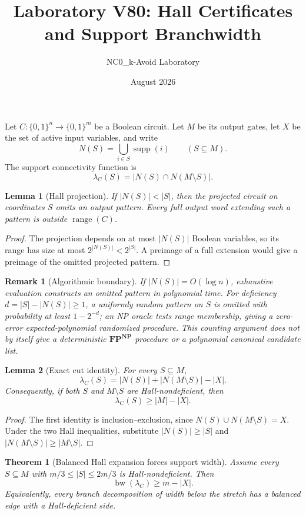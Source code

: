 \documentclass[11pt]{article}
\title{Laboratory V80: Hall Certificates and Support Branchwidth}
\author{NC0\_k-Avoid Laboratory}
\date{August 2026}
\newtheorem{theorem}{Theorem}
\newtheorem{lemma}{Lemma}
\newtheorem{remark}{Remark}
\begin{document}
\maketitle

Let $C:\{0,1\}^n\to\{0,1\}^m$ be a Boolean circuit. Let $M$ be its
output gates, let $X$ be the set of active input variables, and write
\[
 N(S)=\bigcup_{i\in S}\operatorname{supp}(i)
 \qquad(S\subseteq M).
\]
The support connectivity function is
\[
 \lambda_C(S)=|N(S)\cap N(M\setminus S)|.
\]

\begin{lemma}[Hall projection]
If $|N(S)|<|S|$, then the projected circuit on coordinates $S$ omits an
output pattern. Every full output word extending such a pattern is outside
$\operatorname{range}(C)$.
\end{lemma}

\begin{proof}
The projection depends on at most $|N(S)|$ Boolean variables, so its range has
size at most $2^{|N(S)|}<2^{|S|}$. A preimage of a full extension would give a
preimage of the omitted projected pattern.
\end{proof}

\begin{remark}[Algorithmic boundary]
If $|N(S)|=O(\log n)$, exhaustive evaluation constructs an omitted pattern in
polynomial time. For deficiency $d=|S|-|N(S)|\geq1$, a uniformly random pattern
on $S$ is omitted with probability at least $1-2^{-d}$; an NP oracle tests
range membership, giving a zero-error expected-polynomial randomized
procedure. This counting argument does not by itself give a deterministic
$\mathbf{FP}^{\mathbf{NP}}$ procedure or a polynomial canonical candidate
list.
\end{remark}

\begin{lemma}[Exact cut identity]
For every $S\subseteq M$,
\[
 \lambda_C(S)=|N(S)|+|N(M\setminus S)|-|X|.
\]
Consequently, if both $S$ and $M\setminus S$ are Hall-nondeficient, then
\[
 \lambda_C(S)\geq |M|-|X|.
\]
\end{lemma}

\begin{proof}
The first identity is inclusion--exclusion, since
$N(S)\cup N(M\setminus S)=X$. Under the two Hall inequalities, substitute
$|N(S)|\geq|S|$ and
$|N(M\setminus S)|\geq|M\setminus S|$.
\end{proof}

\begin{theorem}[Balanced Hall expansion forces support width]
Assume every $S\subseteq M$ with
$m/3\leq |S|\leq2m/3$ is Hall-nondeficient. Then
\[
 \operatorname{bw}(\lambda_C)\geq m-|X|.
\]
Equivalently, every branch decomposition of width below the stretch has a
balanced edge with a Hall-deficient side.
\end{theorem}
\end{document}
